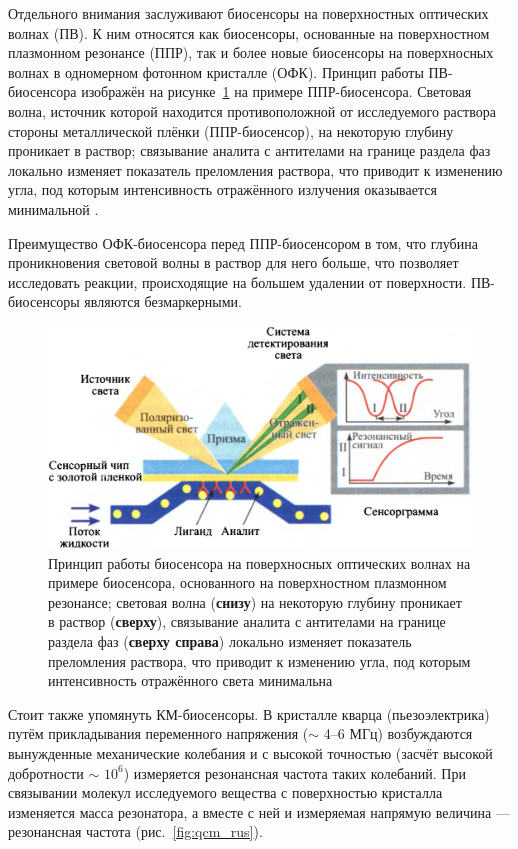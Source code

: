 \documentclass[oneside,final,12pt]{extreport}
\begin{document}
Отдельного внимания заслуживают биосенсоры на поверхностных оптических волнах (ПВ).
К ним относятся как биосенсоры, основанные на поверхностном плазмонном резонансе (ППР),
так и более новые биосенсоры на поверхносных волнах в одномерном фотонном кристалле (ОФК).
Принцип работы ПВ-биосенсора изображён на рисунке~\ref{fig:spr_biosensor_principle}
на примере ППР-биосенсора.
Световая волна, источник которой находится противоположной от исследуемого раствора
стороны металлической плёнки (ППР-биосенсор),%
на некоторую глубину проникает в раствор;
связывание аналита с антителами на границе раздела фаз
локально изменяет показатель преломления раствора, что приводит к изменению
угла, под которым интенсивность отражённого излучения оказывается минимальной%
\cite{bib:klimov_nanoplasmonics}.

Преимущество ОФК-биосенсора перед ППР-биосенсором в том,
что глубина проникновения световой волны в раствор для него больше,
что позволяет исследовать реакции, происходящие
на большем удалении от поверхности.
ПВ-биосенсоры являются безмаркерными.


\begin{figure}
  \centering
  \includegraphics[width=.8\textwidth]{pic/spr_biosensor_principle}

  \caption{%
    \label{fig:spr_biosensor_principle}%
    Принцип работы биосенсора на поверхносных оптических волнах
    на примере биосенсора, основанного на поверхностном плазмонном резонансе;
    световая волна (\textbf{снизу}) на некоторую глубину проникает в раствор (\textbf{сверху}),
    связывание аналита с антителами на границе раздела фаз (\textbf{сверху справа})
    локально изменяет показатель преломления раствора, что приводит к изменению
    угла, под которым интенсивность отражённого света минимальна
  }

\end{figure}

Стоит также упомянуть КМ-биосенсоры.
В кристалле кварца (пьезоэлектрика) путём прикладывания переменного напряжения
($\sim$ 4--6 МГц)
возбуждаются вынужденные механические колебания и с высокой точностью
(засчёт высокой добротности $\sim$ $10^6$)
измеряется резонансная частота таких колебаний.
При связывании молекул исследуемого вещества с поверхностью кристалла
изменяется масса резонатора, а вместе с ней и измеряемая напрямую величина ---
резонансная частота (рис.~\ref{fig:qcm_rus})\cite{bib:qcm_odor}.
\end{document}

